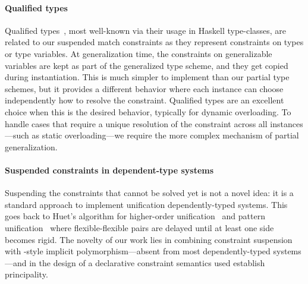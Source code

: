 \documentclass[acmsmall,screen,nonacm,review]{acmart}
\begin{document}
\paragraph{Qualified types}

Qualified types~\citep*{jones-qualified-types}, most well-known via their usage
in Haskell type-classes, are related to our suspended match constraints as they
represent constraints on types or type variables. At generalization time, the
constraints on generalizable variables are kept as part of the generalized type
scheme, and they get copied during instantiation. This is much simpler to
implement than our partial type schemes, but it provides a different behavior
where each instance can choose independently how to resolve the constraint.
Qualified types are an excellent choice when this is the desired behavior,
typically for dynamic overloading. To handle cases that require a unique
resolution of the constraint across all instances---such as static
overloading---we require the more complex mechanism of partial generalization.

\paragraph{Suspended constraints in dependent-type systems}

Suspending the constraints that cannot be solved yet is not a novel idea: it
is a standard approach to implement unification dependently-typed
systems. This goes back to Huet's algorithm for higher-order
unification~\citep*{huet-unif} and pattern
unification~\citep*{Miller/pattern-unif@iclp91} where flexible-flexible
pairs are delayed until at least one side becomes rigid. The novelty of our
work lies in combining constraint suspension with \ML-style implicit
polymorphism---absent from most dependently-typed systems---and in the design
of a declarative constraint semantics used establish principality.


\paragraph{\OutsideIn}
\end{document}
